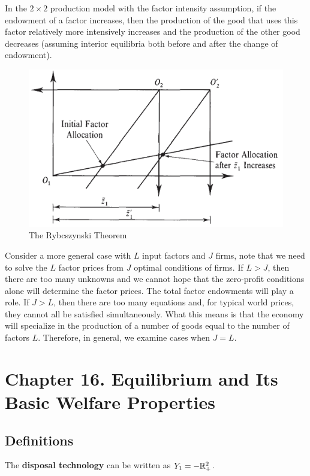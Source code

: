 \documentclass{report}
\begin{document}
			\begin{theorem}
				In the $2 \times 2$ production model with the factor intensity assumption, if the endowment of a factor increases, then the production of the good that uses this factor relatively more intensively increases and the production of the other good decreases (assuming interior equilibria both before and after the change of endowment).
			\end{theorem}
			
			\begin{figure}[h]
				\centering
				\includegraphics[width=0.6\linewidth]{figures/Rybcszynski}
				\caption{The Rybcszynski Theorem}
			\end{figure}
			
			\begin{remark}
				Consider a more general case with $L$ input factors and $J$ firms, note that we need to solve the $L$ factor prices from $J$ optimal conditions of firms. If $L > J$, then there are too many unknowns and we cannot hope that the zero-profit conditions alone will determine the factor prices. The total factor endowments will play a role. If $J > L$, then there are too many equations and, for typical world prices, they cannot all be satisfied simultaneously. What this means is that the economy will specialize in the production of a number of goods equal to the number of factors $L$. Therefore, in general, we examine cases when $J=L$.
			\end{remark}
	\section{Chapter 16. Equilibrium and Its Basic Welfare Properties}
		\subsection{Definitions}
		\begin{remark}
			The \textbf{disposal technology} can be written as $Y_1 = -\mathbb{R}^2_+$.
		\end{remark}
		
\end{document}
